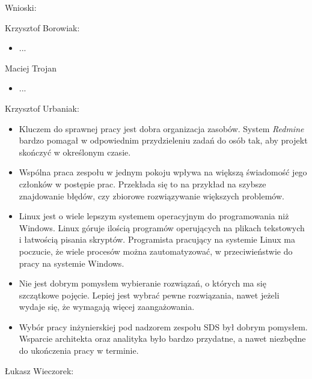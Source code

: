 Wnioski:
\begin{description}
\item Krzysztof Borowiak:
\begin{itemize}
\item ...
\end{itemize}
\item Maciej Trojan
\begin{itemize}
\item ...
\end{itemize}
\item Krzysztof Urbaniak:
\begin{itemize}
\item Kluczem do sprawnej pracy jest dobra organizacja zasobów. System \emph{Redmine} bardzo pomagał w odpowiednim przydzieleniu zadań do osób tak, aby projekt skończyć w określonym czasie.
\item Wspólna praca zespołu w jednym pokoju wpływa na większą świadomość jego członków w postępie prac. Przekłada się to na przykład na szybsze znajdowanie błędów, czy zbiorowe rozwiązywanie większych problemów.
\item Linux jest o wiele lepszym systemem operacyjnym do programowania niż Windows. Linux góruje ilością programów operujących na plikach tekstowych i łatwością pisania skryptów. Programista pracujący na systemie Linux ma poczucie, że wiele procesów można zautomatyzować, w przeciwieństwie do pracy na systemie Windows.
\item Nie jest dobrym pomysłem wybieranie rozwiązań, o których ma się szczątkowe pojęcie. Lepiej jest wybrać pewne rozwiązania, nawet jeżeli wydaje się, że wymagają więcej zaangażowania.
\item Wybór pracy inżynierskiej pod nadzorem zespołu SDS był dobrym pomysłem. Wsparcie architekta oraz analityka było bardzo przydatne, a nawet niezbędne do ukończenia pracy w terminie.
\end{itemize}
\item Łukasz Wieczorek:

\end{description}
